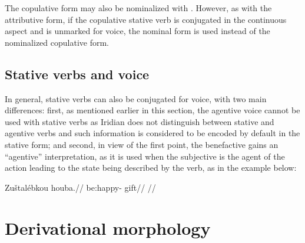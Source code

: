The copulative form may also be nominalized with . However, as with the attributive form, if the copulative stative verb is conjugated in the continuous aspect and is unmarked for voice, the nominal form is used instead of the nominalized copulative form.

\subsection{Stative verbs and voice}

In general, stative verbs can also be conjugated for voice, with two main differences: first, as mentioned earlier in this section, the agentive voice cannot be used with stative verbs as Iridian does not distinguish between stative and agentive verbs and such information is considered to be encoded by default in the stative form; and second, in view of the first point, the benefactive gains an ``agentive'' interpretation, as it is used when the subjective is the agent of the action leading to the state being described by the verb, as in the example below:

\ex
\begingl
\gla Zuštal\'ebkou houba.//
\glb be:happy- gift//
\glft {}//
\endgl
\xe



\section{Derivational morphology}
